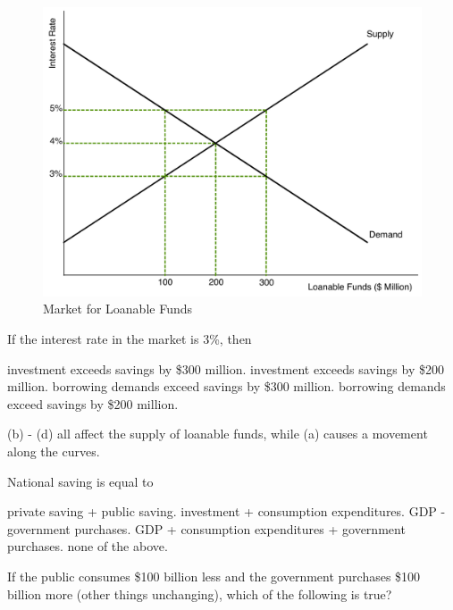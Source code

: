 \documentclass[addpoints,11pt]{exam}
\theoremstyle{definition}
\begin{document}
\begin{questions}
	
	\begin{figure}[H]
		\centering
		\includegraphics[scale=.4]{Exam2_MC27.pdf}
		\caption{Market for Loanable Funds}
		\label{MC27}
	\end{figure}
	
	If the interest rate in the market is 3\%, then 
	
	\begin{choices}
		\choice investment exceeds savings by \$300 million.
		\choice investment exceeds savings by \$200 million.
		\choice borrowing demands exceed savings by \$300 million.
		\CorrectChoice borrowing demands exceed savings by \$200 million.
	\end{choices}

\begin{solution}
	(b) - (d) all affect the supply of loanable funds, while (a) causes a movement along the curves.
\end{solution}

\question National saving is equal to

\begin{choices}
	\CorrectChoice private saving + public saving.
	\choice investment + consumption expenditures.
	\choice GDP - government purchases.
	\choice GDP + consumption expenditures + government purchases.
	\choice none of the above.
\end{choices}

\newpage

\question If the public consumes \$100 billion less and the government purchases \$100 billion more (other things unchanging), which of the following is true?


\end{questions}
\end{document}
